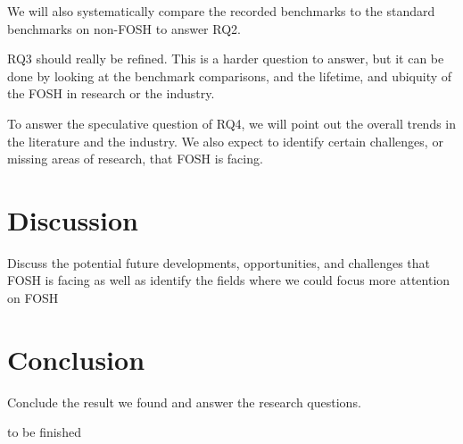\documentclass[acmtog]{acmart}
\begin{document}
We will also systematically compare the recorded benchmarks to the standard benchmarks on non-FOSH to answer RQ2. 

RQ3 should really be refined. 
This is a harder question to answer, but it can be done by looking at the benchmark comparisons, and the lifetime, and ubiquity of the FOSH in research or the industry.

To answer the speculative question of RQ4, we will point out the overall trends in the literature and the industry. 
We also expect to identify certain challenges, or missing areas of research, that FOSH is facing.

\section{Discussion}
Discuss the potential future developments, opportunities, and challenges that FOSH is facing as well as identify the fields where we could focus more attention on FOSH  
\section{Conclusion}
Conclude the result we found and answer the research questions.
\nocite{*}
\printbibliography


\begin{acks}
to be finished
\end{acks}




\appendix
\end{document}
